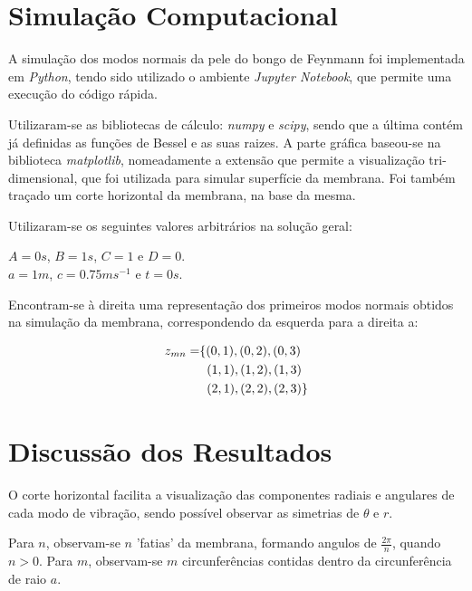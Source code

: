 \documentclass[10pt]{SelfArx} %
\begin{document}
 \section*{Simulação Computacional}
 A simulação dos modos normais da pele do bongo de Feynmann foi implementada em \textit{Python}, tendo sido utilizado o ambiente \textit{Jupyter Notebook}, que permite uma execução do código rápida.
\par Utilizaram-se as bibliotecas de cálculo: \textit{numpy} e \textit{scipy}, sendo que a última contém já definidas as funções de Bessel e as suas raizes. A parte gráfica baseou-se na biblioteca \textit{matplotlib}, nomeadamente a extensão que permite a visualização tri-dimensional, que foi utilizada para simular superfície da membrana. Foi também traçado um corte horizontal da membrana, na base da mesma.

Utilizaram-se os seguintes valores arbitrários na solução geral:
\begin{center}
$A = 0s$, $B = 1s$, $C = 1$ e $D = 0$.\\
$a = 1m$, $c = 0.75 ms^{-1}$ e $t = 0s$.
\end{center}
Encontram-se à direita uma representação dos primeiros modos normais obtidos na simulação da membrana, correspondendo da esquerda para a direita a:

\begin{align*}
    z_{mn} = &\{ (0, 1), (0, 2), (0, 3)\\
             &   \hspace{0.2cm} (1, 1), (1, 2), (1, 3)\\
             &   \hspace{0.2cm} (2, 1), (2, 2), (2, 3)\}
\end{align*}

\section*{Discussão dos Resultados}

O corte horizontal facilita a visualização das componentes radiais e angulares de cada modo de vibração, sendo possível observar as simetrias de $\theta$ e $r$.\par
Para $n$, observam-se $n$ 'fatias' da membrana, formando angulos de $\frac{2\pi}{n}$, quando $n>0$.
Para $m$, observam-se $m$ circunferências contidas dentro da circunferência de raio $a$.
\par 

\end{document}
